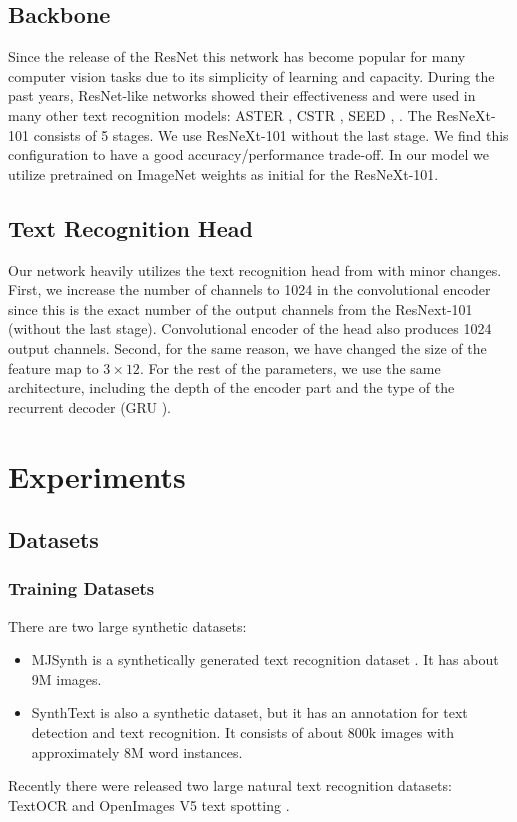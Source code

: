 \documentclass[runningheads]{llncs}
\begin{document}
\subsection{Backbone}
Since the release of the ResNet \cite{resnet} this network has become popular for many
computer vision tasks due to its simplicity of learning and capacity.
During the past years, ResNet-like networks showed their effectiveness and were
used in many other text recognition models: ASTER \cite{aster}, CSTR \cite{cstr},
SEED \cite{qiao2020seed}, \cite{baek2019STRcomparisons}.
The ResNeXt-101 consists of 5 stages. We use ResNeXt-101
without the last stage. We find this configuration to have a good accuracy/performance trade-off.
In our model we utilize pretrained on ImageNet \cite{imagenet} weights as
initial for the ResNeXt-101.


\subsection{Text Recognition Head}
Our network heavily utilizes the text recognition head from \cite{krylov2021open} with minor
changes. First, we increase the number of channels to 1024 in the convolutional encoder since
this is the exact number of the output channels from the ResNext-101 (without the last stage).
Convolutional encoder of the head also produces 1024 output channels. Second, for the same
reason, we have changed the size of the feature map to $3 \times 12$. For the rest of the
parameters, we use the same architecture, including the depth of the encoder part and the type
of the recurrent decoder (GRU \cite{gru}).

\section{Experiments}
\label{sec:experiments}
\subsection{Datasets}

\subsubsection{Training Datasets}
There are two large synthetic datasets:
\begin{itemize}
  \item MJSynth is a synthetically generated text recognition dataset \cite{Jaderberg14c}.
        It has about 9M images.
  \item SynthText is also a synthetic dataset, but it has an annotation for text detection
        and text recognition. It consists of about 800k images with approximately 8M word instances.
\end{itemize}
Recently there were released two large natural text recognition datasets: TextOCR \cite{textocr}
and OpenImages V5 text spotting \cite{krylov2021open}.
\end{document}
